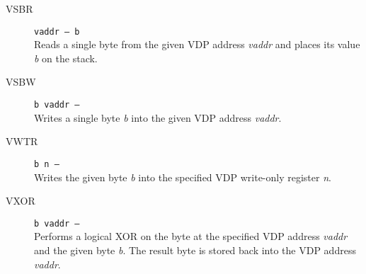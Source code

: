 \documentclass{article}
\begin{document}
\begin{multicols}{2}[]
\begin{description}
			\item[VSBR]\texttt{vaddr --- b }\\
				Reads a single byte from the given VDP address \textit{vaddr} and places
				its value \textit{b} on the stack.

			\item[VSBW]\texttt{b vaddr --- }\\
				Writes a single byte \textit{b} into the given VDP address \textit{vaddr}.

			\item[VWTR]\texttt{b n --- }\\
				Writes the given byte \textit{b} into the specified VDP write-only register
				\textit{n}.

			\item[VXOR]\texttt{b vaddr --- }\\
				Performs a logical XOR on the byte at the specified VDP address
				\textit{vaddr} and the given byte \textit{b}. The result byte is
				stored back into the VDP address \textit{vaddr}.
		\end{description}

	\end{multicols}
\end{document}
